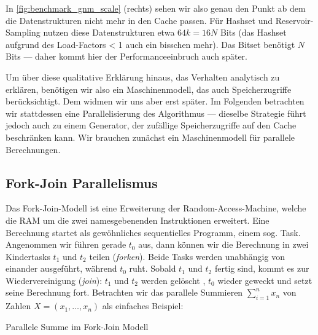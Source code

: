 In \cref{fig:benchmark_gnm_scale} (rechts) sehen wir also genau den Punkt ab dem die Datenstrukturen nicht mehr in den Cache passen.
Für Hashset und Reservoir-Sampling nutzen diese Datenstrukturen etwa $64 k = 16 N$ Bits (das Hashset aufgrund des Load-Factors < 1 auch ein bisschen mehr).
Das Bitset benötigt $N$ Bits --- daher kommt hier der Performanceeinbruch auch später.

Um über diese qualitative Erklärung hinaus, das Verhalten analytisch zu erklären, benötigen wir also ein Maschinenmodell, das auch Speicherzugriffe berücksichtigt.
Dem widmen wir uns aber erst später.
Im Folgenden betrachten wir stattdessen eine Parallelisierung des Algorithmus --- dieselbe Strategie führt jedoch auch zu einem Generator, der zufällige Speicherzugriffe auf den Cache beschränken kann.
Wir brauchen zunächst ein Maschinenmodell für parallele Berechnungen.

\subsection{Fork-Join Parallelismus}
Das Fork-Join-Modell ist eine Erweiterung der Random-Access-Machine, welche die RAM um die zwei namesgebenenden Instruktionen erweitert.
Eine Berechnung startet als gewöhnliches sequentielles Programm, einem sog. Task.
Angenommen wir führen gerade $t_0$ aus, dann können wir die Berechnung in zwei \glqq Kindertasks\grqq{} $t_1$ und $t_2$ teilen  (\emph{forken}).
Beide Tasks werden unabhängig von einander ausgeführt, während $t_0$ ruht.
Sobald $t_1$ und $t_2$ fertig sind, kommt es zur Wiedervereinigung  (\emph{join}):
$t_1$ und $t_2$ werden \glqq gelöscht \grqq, $t_0$ wieder geweckt und setzt seine Berechnung fort.
Betrachten wir das parallele Summieren $\sum_{i=1}^n x_n$ von Zahlen $X = (x_1, \ldots, x_n)$ als einfaches Beispiel:

\begin{algorithm}
    \caption{Parallele Summe im Fork-Join Modell}
    \label{algo:parallel_sum}
\end{algorithm}


